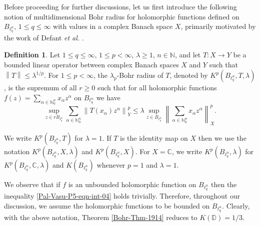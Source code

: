 \documentclass[a4paper,12pt]{amsart}
\theoremstyle{definition}
\newtheorem{defn}{Definition}[section]
\newcommand{\norm}[1]{\left\lVert#1\right\rVert}
\begin{document}
Before proceeding for further discussions, let us first introduce the following notion of multidimensional Bohr radius for holomorphic functions defined on $B_{\ell^n_q},\, 1\leq q\leq \infty$ with values in a complex Banach space $X$, primarily motivated by the work of Defant {\it et al.} \cite{defant-adv-math-2012}.
\begin{defn}\label{Pal-Vasu-P5-defn-01}
	Let $1\leq q\leq \infty$, $1\leq p<\infty$, $\lambda\geq 1$, $n\in \mathbb{N}$, and let $T: X \rightarrow Y$ be a bounded linear operator between complex Banach spaces $X$ and $Y$ such that $\norm{T}\leq \lambda^{1/p}$. For $1\leq p<\infty$, the $\lambda_{p}$-Bohr radius of $T$, denoted by $K^p(B_{\ell^n_{q}}, T,\lambda)$, is the supremum of all $r\geq 0$ such that for all holomorphic functions $f(z)=\sum_{\alpha\in \mathbb{N}^n_{0}}x_{\alpha}z^{\alpha}$ on $B_{\ell^n_{q}}$ we have 
	\begin{equation}\label{Pal-Vasu-P5-eqn-int-04}
		\sup_{z\in rB_{\ell^n_{q}}}\sum_{\alpha\in \mathbb{N}^n_{0}}\norm{T(x_{\alpha})z^{\alpha}}^{p}_{Y}\leq \lambda\sup_{z\in B_{\ell^n_{q}}}\norm{\sum_{\alpha\in \mathbb{N}^n_{0}}x_{\alpha}z^{\alpha}}^p_{X}.
	\end{equation}
\end{defn}
\noindent
We write $K^p(B_{\ell^n_q},T)$ for $\lambda=1$. If $T$ is the identity map on $X$ then we use the notation $K^p(B_{\ell^n_q},X,\lambda)$ and $K^p(B_{\ell^n_q},X)$. For $X=\mathbb{C}$, we write $K^p(B_{\ell^n_q},\lambda)$ for $K^p(B_{\ell^n_q},\mathbb{C},\lambda)$ and $K(B_{\ell^n_q})$ whenever $p=1$ and $\lambda=1$.
\vspace{3mm}

We observe that if $f$ is an unbounded holomorphic function on $B_{\ell^n_q}$ then the inequality \eqref{Pal-Vasu-P5-eqn-int-04} holds trivially. Therefore, throughout our discussion, we assume the holomorphic functions to be bounded on $B_{\ell^n_q}$. Clearly, with the above notation, Theorem \ref{Bohr-Thm-1914} reduces to $	K(\mathbb{D})=1/3$.
\end{document}
